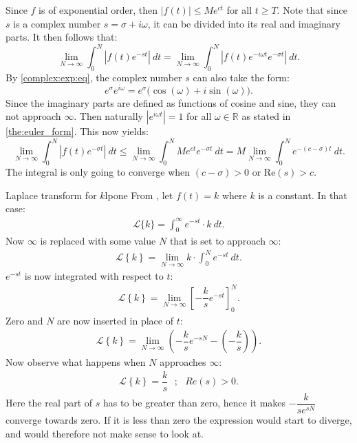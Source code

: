 \begin{prof}{}{}
Since $f$ is of exponential order, then $|f(t)| \leq Me^{ct}$ for all $t \geq T$. Note that since $s$ is a complex number  $s=\sigma+i\omega$, it can be divided into its real and imaginary parts. It then follows that: $$\lim_{N \to \infty} \int_{0}^{N} \left|f(t)e^{-st} \right|\ dt = \lim_{N \to \infty} \int_{0}^{N} \left|f(t) e^{-i\omega t} e^{-\sigma t} \right| \ dt.$$
By \cref{complex:exp:eq}, the complex number $s$ can also take the form: 
$$e^{\sigma}e^{i\omega}= e^{\sigma} \big(\cos(\omega)+i\sin(\omega) \big).$$
Since the imaginary parts are defined as functions of cosine and sine, they can not approach $\infty$. Then naturally $\left|e^{i\omega t} \right|=1$ for all $\omega \in \mathbb{R}$ as stated in \cref{the:euler_form}. This now yields: $$\lim_{N \to \infty} \int_{0}^{N} |f(t)e^{-\sigma t}|\ dt \leq \lim_{N \to \infty} \int_{0}^{N} Me^{ct}e^{-\sigma t}\ dt = M \lim_{N \to \infty} \int_{0}^{N}e^{-(c-\sigma)t}\ dt. $$ The integral is only going to converge when $(c-\sigma)>0$ or Re$(s)>c$.
\end{prof}

\begin{example}{Laplace transform for $k$}{lpone}
From , let $f(t)=k$ where $k$ is a constant. In that case:
\begin{align*}
\mathcal{L}\{k\}=\int_{0}^{\infty} e^{-st} \cdot k\ dt.
\end{align*}
Now $\infty$ is replaced with some value $N$ that is set to approach $\infty$:
\begin{align*}
\mathcal{L} \left\{k \right\}= \lim_{N \to \infty} k\cdot \int_{0}^{N} e^{-st}\ dt.
\end{align*}
$e^{-st}$ is now integrated with respect to $t$:
\begin{align*}
\mathcal{L} \left\{k \right\}= \lim_{N \to \infty} \left[ -\dfrac{k}{s} e^{-st} \right]_{0}^{N}.  
\end{align*}
Zero and $N$ are now inserted in place of $t$:
\begin{align*}
\mathcal{L} \left\{k \right\}= \lim_{N \to \infty} \left( -\dfrac{k}{s} e^{-sN} - \left(-\dfrac{k}{s}\right) \right).
\end{align*}
Now observe what happens when $N$ approaches $\infty$:
\begin{align*}
\mathcal{L} \left\{k \right\}=\dfrac{k}{s} \ \ \ ; \ \ \ Re(s) > 0.
\end{align*}
Here the real part of $s$ has to be greater than zero, hence it makes $-\dfrac{k}{se^{sN}}$ converge towards zero. If it is less than zero the expression would start to diverge, and would therefore not make sense to look at.
\end{example}

